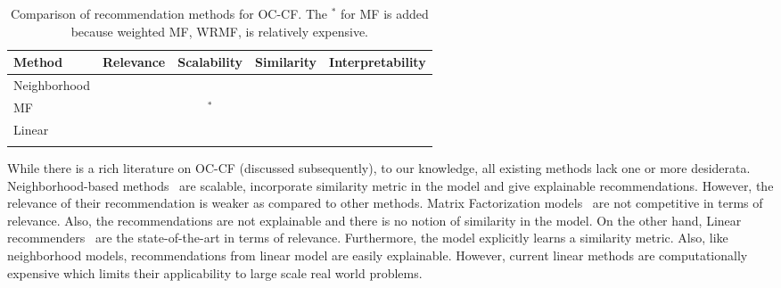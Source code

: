 \begin{table*}[!t]
	\centering

		\begin{tabular}{llccc}
		\toprule
		\toprule	
		\textbf{Method} & \textbf{Relevance} & \textbf{Scalability} & \textbf{Similarity} & \textbf{Interpretability} \\
		\toprule
		Neighborhood & \cross & \tick & \tick & \tick \\
		MF & \cross & \tick$^*$  & \cross & \cross \\
		Linear & \tick & \cross & \tick & \tick \\
		\LinearLow & \tick & \tick & \tick & \tick \\
		\bottomrule
		\end{tabular}
	\caption{Comparison of recommendation methods for OC-CF. The $^*$ for MF is added because weighted MF, WRMF, is relatively expensive.}
	\label{tbl:comparison}
\end{table*}

While there is a rich literature on OC-CF (discussed subsequently),
to our knowledge, all existing methods lack one
or more desiderata. 
Neighborhood-based methods~\citep{Sarwar:2001, Linden:2003} are scalable, incorporate similarity metric in the model and give explainable recommendations. 
However, the relevance of their recommendation is weaker as compared to other methods. 
Matrix Factorization models~\citep{Hu:2008} are %
not competitive in terms of relevance. Also, the recommendations are not explainable and there is no notion of similarity in the model. On the other hand, Linear recommenders~\cite{Ning:2011, Sedhain:2016} are the state-of-the-art in terms of relevance. Furthermore, the model explicitly learns a similarity metric. Also, like neighborhood models, recommendations from linear model are easily explainable. However, current linear methods are computationally expensive which limits their applicability to large scale real world problems. 


